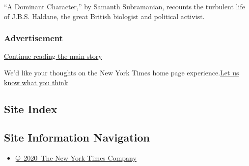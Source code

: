 ``A Dominant Character,'' by Samanth Subramanian, recounts the turbulent
life of J.B.S. Haldane, the great British biologist and political
activist.

\href{/2020/07/28/books/review/a-dominant-character-haldane-samanth-subramanian.html}{}

\hypertarget{advertisement}{%
\subsubsection{Advertisement}\label{advertisement}}

\protect\hyperlink{after-dfp-ad-mid1-large}{Continue reading the main
story}

We'd like your thoughts on the New York Times home page
experience.\href{http://nyt.qualtrics.com/jfe/form/SV_eFJmKj9v0krSE0l}{Let
us know what you think}

\hypertarget{site-index}{%
\subsection{Site Index}\label{site-index}}

\hypertarget{site-information-navigation}{%
\subsection{Site Information
Navigation}\label{site-information-navigation}}

\begin{itemize}
\tightlist
\item
  \href{https://help.nytimes3xbfgragh.onion/hc/en-us/articles/115014792127-Copyright-notice}{©~2020~The
  New York Times Company}
\end{itemize}

